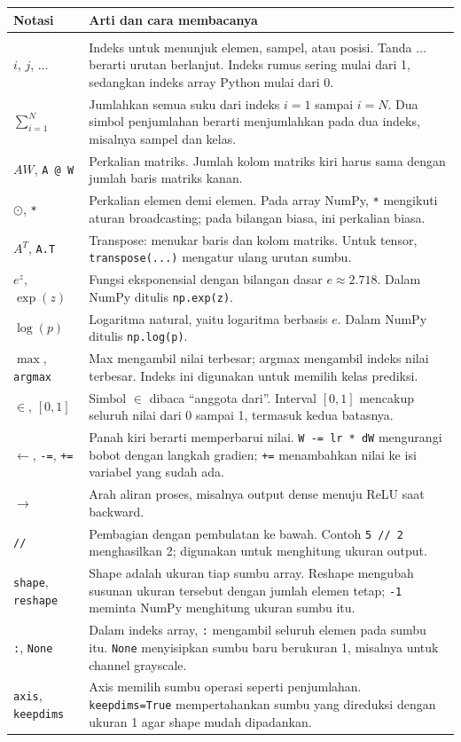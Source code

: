 \documentclass[12pt, letterpaper]{article}
\begin{document}
\begin{longtable}{@{}>{\raggedright\arraybackslash}p{}>{\raggedright\arraybackslash}p{}@{}}
\textbf{Notasi} & \textbf{Arti dan cara membacanya} \\
\hline
\endhead
\multicolumn{2}{@{}l}{\textbf{Operator matematika dan notasi NumPy}} \\
$i$, $j$, $\ldots$ & Indeks untuk menunjuk elemen, sampel, atau posisi. Tanda $\ldots$ berarti urutan berlanjut. Indeks rumus sering mulai dari 1, sedangkan indeks array Python mulai dari 0. \\
$\sum_{i=1}^{N}$ & Jumlahkan semua suku dari indeks $i=1$ sampai $i=N$. Dua simbol penjumlahan berarti menjumlahkan pada dua indeks, misalnya sampel dan kelas. \\
$AW$, \texttt{A @ W} & Perkalian matriks. Jumlah kolom matriks kiri harus sama dengan jumlah baris matriks kanan. \\
$\odot$, \texttt{*} & Perkalian elemen demi elemen. Pada array NumPy, \texttt{*} mengikuti aturan broadcasting; pada bilangan biasa, ini perkalian biasa. \\
$A^T$, \texttt{A.T} & Transpose: menukar baris dan kolom matriks. Untuk tensor, \texttt{transpose(...)} mengatur ulang urutan sumbu. \\
$e^z$, $\exp(z)$ & Fungsi eksponensial dengan bilangan dasar $e\approx2.718$. Dalam NumPy ditulis \texttt{np.exp(z)}. \\
$\log(p)$ & Logaritma natural, yaitu logaritma berbasis $e$. Dalam NumPy ditulis \texttt{np.log(p)}. \\
$\max$, \texttt{argmax} & Max mengambil nilai terbesar; argmax mengambil indeks nilai terbesar. Indeks ini digunakan untuk memilih kelas prediksi. \\
$\in$, $[0,1]$ & Simbol $\in$ dibaca ``anggota dari''. Interval $[0,1]$ mencakup seluruh nilai dari 0 sampai 1, termasuk kedua batasnya. \\
$\leftarrow$, \texttt{-=}, \texttt{+=} & Panah kiri berarti memperbarui nilai. \texttt{W -= lr * dW} mengurangi bobot dengan langkah gradien; \texttt{+=} menambahkan nilai ke isi variabel yang sudah ada. \\
$\rightarrow$ & Arah aliran proses, misalnya output dense menuju ReLU saat backward. \\
\texttt{//} & Pembagian dengan pembulatan ke bawah. Contoh \texttt{5 // 2} menghasilkan 2; digunakan untuk menghitung ukuran output. \\
\texttt{shape}, \texttt{reshape} & Shape adalah ukuran tiap sumbu array. Reshape mengubah susunan ukuran tersebut dengan jumlah elemen tetap; \texttt{-1} meminta NumPy menghitung ukuran sumbu itu. \\
\texttt{:}, \texttt{None} & Dalam indeks array, \texttt{:} mengambil seluruh elemen pada sumbu itu. \texttt{None} menyisipkan sumbu baru berukuran 1, misalnya untuk channel grayscale. \\
\texttt{axis}, \texttt{keepdims} & Axis memilih sumbu operasi seperti penjumlahan. \texttt{keepdims=True} mempertahankan sumbu yang direduksi dengan ukuran 1 agar shape mudah dipadankan. \\
\end{longtable}
\endgroup
\end{document}
